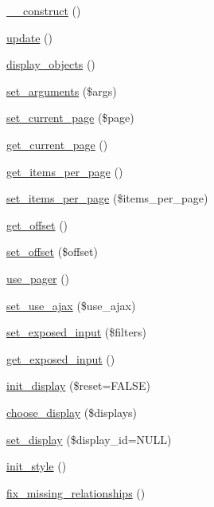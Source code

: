 \begin{DoxyCompactItemize}
\item 
\hyperlink{classview_ab7ff00930c1773ddc3e1497b57543e04}{\_\-\_\-construct} ()
\item 
\hyperlink{classview_aa156afa62846e39a15a7e9027d4d58b6}{update} ()
\item 
\hyperlink{classview_a1338697759506981e17d1c4772b13aa6}{display\_\-objects} ()
\item 
\hyperlink{classview_a3cc8de2cedfc558314c27ee8ca995235}{set\_\-arguments} (\$args)
\item 
\hyperlink{classview_a421f000fc97fb8f7dda965cbdd285071}{set\_\-current\_\-page} (\$page)
\item 
\hyperlink{classview_a378b971894ed8b9c0ddaf36c8da52819}{get\_\-current\_\-page} ()
\item 
\hyperlink{classview_a3e74e79be315a0db27ed07782da5859d}{get\_\-items\_\-per\_\-page} ()
\item 
\hyperlink{classview_ad1f69acfdb3771ec2d6f54fdb7ed7e4c}{set\_\-items\_\-per\_\-page} (\$items\_\-per\_\-page)
\item 
\hyperlink{classview_acf28a271baf8de169d84071d7ab5e53d}{get\_\-offset} ()
\item 
\hyperlink{classview_ae8156db948b1c7efaeeebd72148147f5}{set\_\-offset} (\$offset)
\item 
\hyperlink{classview_aa8b3c1c132ab039dd24c13c2bccf5948}{use\_\-pager} ()
\item 
\hyperlink{classview_a77bfc90f75fc5bdbf34cb7f7678c4840}{set\_\-use\_\-ajax} (\$use\_\-ajax)
\item 
\hyperlink{classview_abe2340e413d0ef7a6dfeba37f09fc88c}{set\_\-exposed\_\-input} (\$filters)
\item 
\hyperlink{classview_ac89e7aa08b258bc09d8e6209c6ebcfc2}{get\_\-exposed\_\-input} ()
\item 
\hyperlink{classview_a5d314e75f3ebe2c46988e9b0c6b9b3b4}{init\_\-display} (\$reset=FALSE)
\item 
\hyperlink{classview_a66ba9a9554f6f5fc3e2ee54e448b6f32}{choose\_\-display} (\$displays)
\item 
\hyperlink{classview_aafb326696e2de96d2012882b5275c54c}{set\_\-display} (\$display\_\-id=NULL)
\item 
\hyperlink{classview_a22ea4e41e69fadff64193a54a63a24e9}{init\_\-style} ()
\item 
\hyperlink{classview_a7bdc3ece9cac87a5a0bee5166f0373a8}{fix\_\-missing\_\-relationships} ()
\item 

\end{DoxyCompactItemize}
